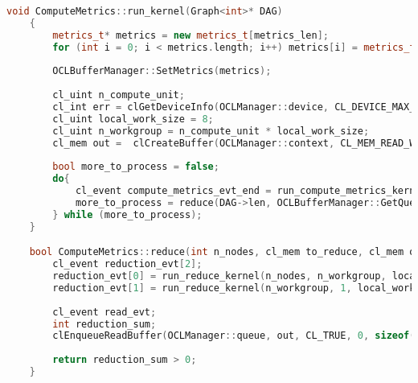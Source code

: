 \newpage

\begin{lstlisting}[language=C++, caption={Codice host per il kernel compute\_metrics },captionpos=b]
	void ComputeMetrics::run_kernel(Graph<int>* DAG)
	{
		metrics_t* metrics = new metrics_t[metrics_len]; 
		for (int i = 0; i < metrics.length; i++) metrics[i] = metrics_t{ DAG->nodes[i],0,i};
		
		OCLBufferManager::SetMetrics(metrics);
		
		cl_uint n_compute_unit;
		cl_int err = clGetDeviceInfo(OCLManager::device, CL_DEVICE_MAX_COMPUTE_UNITS, sizeof(n_compute_unit), &n_compute_unit);
		cl_uint local_work_size = 8;
		cl_uint n_workgroup = n_compute_unit * local_work_size;
		cl_mem out =  clCreateBuffer(OCLManager::context, CL_MEM_READ_WRITE, n_workgroup * sizeof(cl_int));
		
		bool more_to_process = false;
		do{
			cl_event compute_metrics_evt_end = run_compute_metrics_kernel();
			more_to_process = reduce(DAG->len, OCLBufferManager::GetQueue(), out, n_workgroup, local_work_size, 1, &compute_metrics_evt_end);
		} while (more_to_process);
	}

	bool ComputeMetrics::reduce(int n_nodes, cl_mem to_reduce, cl_mem out, cl_int n_workgroup, cl_int local_work_size, cl_int num_events_to_wait, cl_event* to_wait) {		
		cl_event reduction_evt[2];
		reduction_evt[0] = run_reduce_kernel(n_nodes, n_workgroup, local_work_size, out, to_reduce, num_events_to_wait, to_wait);
		reduction_evt[1] = run_reduce_kernel(n_workgroup, 1, local_work_size, out, out, 1, &reduction_evt[0]);
		
		cl_event read_evt;
		int reduction_sum;
		clEnqueueReadBuffer(OCLManager::queue, out, CL_TRUE, 0, sizeof(reduction_sum), &reduction_sum, 1, reduction_evt + 1, &read_evt);
		
		return reduction_sum > 0;
	}
\end{lstlisting}

